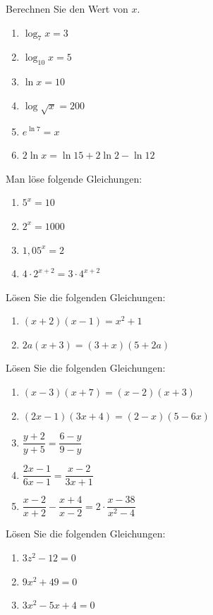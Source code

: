 \begin{uebungsaufgaben}
  \item Berechnen Sie den Wert von $x$.
    \begin{enumerate}[label=\alph*)]
      \item $\log_7 x = 3$
      \item $\log_{10} x = 5$
      \item $\ln x = 10$
      \item $\log \sqrt{x} = 200$
      \item $e^{\ln 7} = x$
      \item $2\ln x = \ln 15 + 2\ln 2 - \ln 12$
    \end{enumerate}
  \item Man löse folgende Gleichungen:
    \begin{enumerate}[label=\alph*)]
      \item $5^x = 10$
      \item $2^x = 1000$
      \item $1{,}05^x = 2$
      \item $4 \cdot 2^{x+2} = 3 \cdot 4^{x+2}$
    \end{enumerate}
  \item Lösen Sie die folgenden Gleichungen:
    \begin{enumerate}[label=\alph*)]
      \item $(x+2)(x-1) = x^2 + 1$
      \item $2a(x+3) = (3+x)(5+2a)$
    \end{enumerate}
  \item Lösen Sie die folgenden Gleichungen:
    \begin{enumerate}[label=\alph*)]
      \item $(x-3)(x+7) = (x-2)(x+3)$
      \item $(2x-1)(3x+4) = (2-x)(5-6x)$
      \item $\dfrac{y+2}{y+5} = \dfrac{6-y}{9-y}$
      \item $\dfrac{2x-1}{6x-1} = \dfrac{x-2}{3x+1}$
      \item $\dfrac{x-2}{x+2} - \dfrac{x+4}{x-2} = 2 \cdot \dfrac{x-38}{x^2-4}$
    \end{enumerate}
  \item Lösen Sie die folgenden Gleichungen:
    \begin{enumerate}[label=\alph*)]
      \item $3z^2 - 12 = 0$
      \item $9x^2 + 49 = 0$
      \item $3x^2 - 5x + 4 = 0$

\end{enumerate}
\end{uebungsaufgaben}
